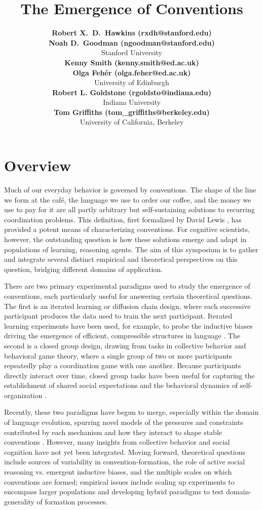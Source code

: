 \documentclass[10pt,letterpaper]{article}
\title{The Emergence of Conventions}
\author{
{\large \bf Robert X.~D.~Hawkins (rxdh@stanford.edu)} \\ 
{\large \bf Noah D.~Goodman (ngoodman@stanford.edu)}\\
  Stanford University \\
  {\large \bf Kenny Smith (kenny.smith@ed.ac.uk)} \\
{\large \bf Olga Feh\'er (olga.feher@ed.ac.uk)} \\
  University of Edinburgh \\
{\large \bf Robert L. Goldstone (rgoldsto@indiana.edu)}\\
  Indiana University\\  
{\large \bf Tom Griffiths (tom\_griffiths@berkeley.edu)}\\
University of California, Berkeley}
\begin{document}
\maketitle

\section{Overview}

Much of our everyday behavior is governed by conventions. The shape of the line we form at the caf\'e, the language we use to order our coffee, and the money we use to pay for it are all partly arbitrary but self-sustaining solutions to recurring coordination problems. This definition, first formalized by David Lewis \citeyear{Lewis69_Convention}, has provided a potent means of characterizing conventions. For cognitive scientists, however, the outstanding question is how these solutions emerge and adapt in populations of learning, reasoning agents. The aim of this symposium is to gather and integrate several distinct empirical and theoretical perspectives on this question, bridging different domains of application.

There are two primary experimental paradigms used to study the emergence of conventions, each particularly useful for answering certain theoretical questions. The first is an iterated learning or diffusion chain design, where each successive participant produces the data used to train the next participant. Iterated learning experiments have been used, for example, to probe the inductive biases driving the emergence of efficient, compressible structures in language \cite{KirbyCornishSmith08_PNAS, GriffithsKalish07_LanguageEvolution}. The second is a closed group design, drawing from tasks in collective behavior and behavioral game theory, where a single group of two or more participants repeatedly play a coordination game with one another. Because participants directly interact over time, closed group tasks have been useful for capturing the establishment of shared social expectations and the behavioral dynamics of self-organization \cite{ClarkWilkesGibbs86_ReferringCollaborative, GoldstoneRobertsGureckis08_EmergentProcesses, Galantucci05_EmergenceOfCommunication}.

Recently, these two paradigms have begun to merge, especially within the domain of language evolution, spurring novel models of the pressures and constraints contributed by each mechanism and how they interact to shape stable conventions \cite{KirbyTamarizCornishSmith15_CompressionCommunication, CentolaBaronchelli15_ConventionEmergence}. However, many insights from collective behavior and social cognition have not yet been integrated. Moving forward, theoretical questions include sources of variability in convention-formation, the role of active social reasoning vs. emergent inductive biases, and the multiple scales on which conventions are formed; empirical issues include scaling up experiments to encompass larger populations and developing hybrid paradigms to test domain-generality of formation processes. 
\end{document}

